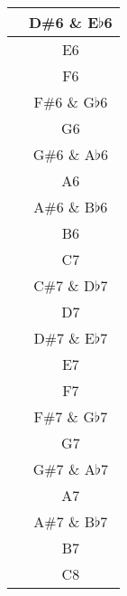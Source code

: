 \documentclass[twoside]{article}
\newcounter{rownumber}
\begin{document}
\begin{center}
\begin{supertabular}{>{\therownumber} c c}
     \hline
     & D\#6 \& E$\flat$6  \\ 
     \hline
     & E6 \\ 
     \hline
     & F6 \\ 
     \hline
     & F\#6 \& G$\flat$6 \\ 
     \hline
     & G6 \\ 
     \hline
     & G\#6 \& A$\flat$6 \\ 
     \hline
     & A6 \\ 
     \hline
     & A\#6 \& B$\flat$6 \\ 
     \hline
     & B6 \\
     \hline
     & C7 \\ 
     \hline
     & C\#7 \& D$\flat$7  \\ 
     \hline
     & D7  \\ 
     \hline
     & D\#7 \& E$\flat$7  \\ 
     \hline
     & E7 \\ 
     \hline
     & F7 \\ 
     \hline
     & F\#7 \& G$\flat$7 \\ 
     \hline
     & G7 \\ 
     \hline
     & G\#7 \& A$\flat$7 \\ 
     \hline
     & A7 \\ 
     \hline
     & A\#7 \& B$\flat$7 \\ 
     \hline
     & B7 \\ 
     \hline
     & C8 \\ 
     \hline
     
\end{supertabular}
\end{center}
\end{document}
